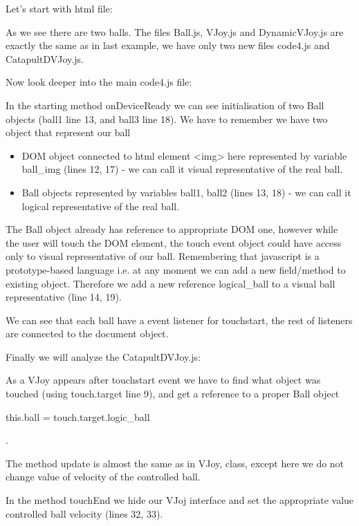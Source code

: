 Let's start with html file:


As we see there are two balls. The files Ball.js, VJoy.js and DynamicVJoy.js are exactly the same as in last example, we have only two new files code4.js and CatapultDVJoy.js.

Now look deeper into the main code4.js file:


\begin{explain}
In the starting method onDeviceReady we can see initialisation of two Ball objects (ball1 line 13, and ball3 line 18). We have to remember we have two object that represent our ball
\begin{itemize}
\item DOM object connected to html element <img> here represented by variable ball\_img (lines 12, 17) - we can call it visual representative of the real ball.
\item Ball objects represented by variables ball1, ball2 (lines 13, 18) - we can call it logical representative of the real ball.
\end{itemize}
The Ball object already has reference to appropriate DOM one, however while the user will touch the DOM element, the touch event object could have access only to visual representative of our ball. Remembering that javascript is a prototype-based language i.e. at any moment we can add a new field/method to existing object. Therefore we add a new reference logical\_ball to a visual ball representative (line 14, 19).

We can see that each ball have a event listener for touchstart, the rest of listeners are connected to the document object.
\end{explain}

Finally we will analyze the CatapultDVJoy.js:


\begin{explain}
As a VJoy appears after touchstart event we have to find what object was touched (using touch.target line 9), and get a reference to a proper Ball object \begin{warning} this.ball = touch.target.logic\_ball\end{warning}. 

The method update is almost the same as in VJoy, class, except here we do not change value of velocity of the controlled ball.

In the method touchEnd we hide our VJoj interface and set the appropriate value controlled ball velocity (lines 32, 33).
\end{explain}

